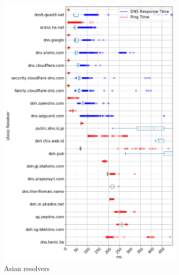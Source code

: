 \begin{figure}[t!]
\begin{subfigure}[t]{0.5\textwidth}
        \includegraphics[width=\linewidth]{figures/Ohio_Asia.png}
        \caption{Asian resolvers}
    \end{subfigure}
    ~ 
    \begin{subfigure}[t]{0.5\textwidth}
        \centering

\end{subfigure}
\end{figure}
